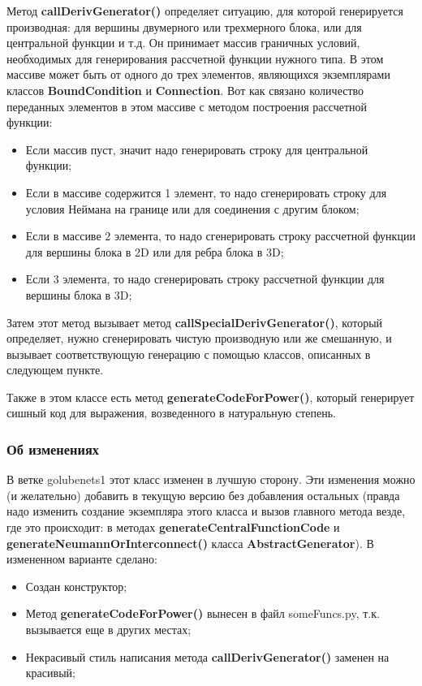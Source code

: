 \documentclass[a4paper]{article}
\begin{document}
Метод {\bf callDerivGenerator()} определяет ситуацию, для которой генерируется производная: для вершины двумерного или трехмерного блока, или для центральной функции и т.д. Он принимает массив граничных условий, необходимых для генерирования рассчетной функции нужного типа. В этом массиве может быть от одного до трех элементов, являющихся экземплярами классов {\bf BoundCondition} и {\bf Connection}. Вот как связано количество переданных элементов в этом массиве с методом построения рассчетной функции:
\begin{itemize}
\item Если массив пуст, значит надо генерировать строку для центральной функции;
\item Если в массиве содержится 1 элемент, то надо сгенерировать строку для условия Неймана на границе или для соединения с другим блоком;
\item Если в массиве 2 элемента, то надо сгенерировать строку рассчетной функции для вершины блока в 2D или для ребра блока в 3D;
\item Если 3 элемента, то надо сгенерировать строку рассчетной функции для вершины блока в 3D;
\end{itemize}
Затем этот метод вызывает метод {\bf call\-Spe\-ci\-al\-De\-riv\-Ge\-ne\-ra\-tor()}, который определяет, нужно сгенерировать чистую производную или же смешанную, и вызывает соответствующую генерацию с помощью классов, описанных в следующем пункте.

Также в этом классе есть метод {\bf generateCodeForPower()}, который генерирует сишный код для выражения, возведенного в натуральную степень.

\subsubsection{\large Об изменениях}

В ветке golubenets1 этот класс изменен в лучшую сторону. Эти изменения можно (и желательно) добавить в текущую версию без добавления остальных (правда надо изменить создание экземпляра этого класса и вызов главного метода везде, где это происходит: в методах {\bf ge\-ne\-rate\-Cent\-ral\-Func\-ti\-on\-Co\-de} и {\bf ge\-ne\-rate\-Neu\-mann\-Or\-In\-ter\-con\-nect()} класса {\bf AbstractGenerator}). В измененном варианте сделано:
\begin{itemize}
\item Создан конструктор;
\item Метод {\bf generateCodeForPower()} вынесен в файл someFuncs.py, т.к. вызывается еще в других местах;
\item Некрасивый стиль написания метода {\bf callDerivGenerator()} заменен на красивый;
\end{itemize}
\end{document}
